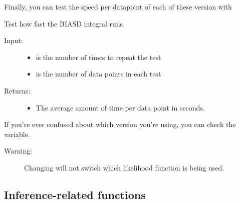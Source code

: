 \documentclass[letterpaper,10pt,english]{sphinxmanual}
\begin{document}
Finally, you can test the speed per datapoint of each of these version with

\begin{fulllineitems}
\label{code_likelihood:likelihood.test_speed}
Test how fast the BIASD integral runs.
\begin{description}
\item[{Input:}] \leavevmode\begin{itemize}
\item {} 
 is the number of times to repeat the test

\item {} 
 is the number of data points in each test

\end{itemize}

\item[{Returns:}] \leavevmode\begin{itemize}
\item {} 
The average amount of time per data point in seconds.

\end{itemize}

\end{description}

\end{fulllineitems}


If you're ever confused about which version you're using, you can check the  variable.
\begin{description}
\item[{Warning:}] \leavevmode
Changing  will not switch which likelihood function is being used.

\end{description}


\subsection{Inference-related functions}
\label{code_likelihood:module-likelihood}\label{code_likelihood:inference-related-functions}
\end{document}
